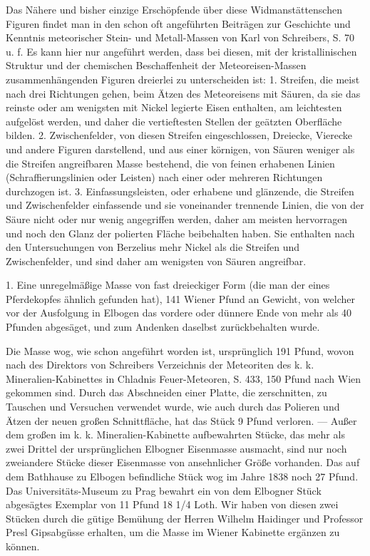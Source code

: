 \documentclass[a4paper, 11pt, oneside, polutonikogreek, german]{article}
\begin{document}
Das Nähere und bisher einzige Erschöpfende über diese Widmanstättenschen Figuren findet man in den schon oft angeführten Beiträgen zur Geschichte und Kenntnis meteorischer Stein- und Metall-Massen von Karl von Schreibers, S. 70 u. f. Es kann hier nur angeführt werden, dass bei diesen, mit der kristallinischen Struktur und der chemischen Beschaffenheit der Meteoreisen-Massen zusammenhängenden Figuren dreierlei zu unterscheiden ist: 1. Streifen, die meist nach drei Richtungen gehen, beim Ätzen des Meteoreisens mit Säuren, da sie das reinste oder am wenigsten mit Nickel legierte Eisen enthalten, am leichtesten aufgelöst werden, und daher die vertieftesten Stellen der geätzten Oberfläche bilden. 2. Zwischenfelder, von diesen Streifen eingeschlossen, Dreiecke, Vierecke und andere Figuren darstellend, und aus einer körnigen, von Säuren weniger als die Streifen angreifbaren Masse bestehend, die von feinen erhabenen Linien (Schraffierungslinien oder Leisten) nach einer oder mehreren Richtungen durchzogen ist. 3. Einfassungsleisten, oder erhabene und glänzende, die Streifen und Zwischenfelder einfassende und sie voneinander trennende Linien, die von der Säure nicht oder nur wenig angegriffen werden, daher am meisten hervorragen und noch den Glanz der polierten Fläche beibehalten haben. Sie enthalten nach den Untersuchungen von Berzelius mehr Nickel als die Streifen und Zwischenfelder, und sind daher am wenigsten von Säuren angreifbar.

1. Eine unregelmäßige Masse von fast dreieckiger Form (die man der eines Pferdekopfes ähnlich gefunden hat), 141 Wiener Pfund an Gewicht, von welcher vor der Ausfolgung in Elbogen das vordere oder dünnere Ende von mehr als 40 Pfunden abgesäget, und zum Andenken daselbst zurückbehalten wurde.

Die Masse wog, wie schon angeführt worden ist, ursprünglich 191 Pfund, wovon nach des Direktors von Schreibers Verzeichnis der Meteoriten des k. k. Mineralien-Kabinettes in Chladnis Feuer-Meteoren, S. 433, 150 Pfund nach Wien gekommen sind. Durch das Abschneiden einer Platte‚ die zerschnitten, zu Tauschen und Versuchen verwendet wurde, wie auch durch das Polieren und Ätzen der neuen großen Schnittfläche, hat das Stück 9 Pfund verloren. — Außer dem großen im k. k. Mineralien-Kabinette aufbewahrten Stücke, das mehr als zwei Drittel der ursprünglichen Elbogner Eisenmasse ausmacht, sind nur noch zweiandere Stücke dieser Eisenmasse von ansehnlicher Größe vorhanden. Das auf dem Bathhause zu Elbogen befindliche Stück wog im Jahre 1838 noch 27 Pfund. Das Universitäts-Museum zu Prag bewahrt ein von dem Elbogner Stück abgesägtes Exemplar von 11 Pfund 18 1/4 Loth. Wir haben von diesen zwei Stücken durch die gütige Bemühung der Herren Wilhelm Haidinger und Professor Presl Gipsabgüsse erhalten, um die Masse im Wiener Kabinette ergänzen zu können.
\end{document}
